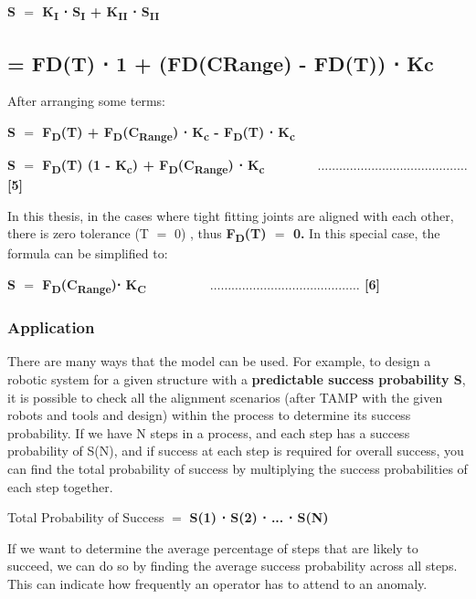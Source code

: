 \documentclass[11pt]{book}
\begin{document}
\textbf{S $=$ K\textsubscript{I} ⋅ S\textsubscript{I} + K\textsubscript{II} ⋅ S\textsubscript{II}}

\subsection{= FD(T) ⋅ 1 + (FD(CRange) - FD(T)) ⋅ Kc}

After arranging some terms:

\textbf{S $=$ F\textsubscript{D}(T) + F\textsubscript{D}(C\textsubscript{Range}) ⋅ K\textsubscript{c} - F\textsubscript{D}(T) ⋅ K\textsubscript{c}}

\textbf{S $=$ F\textsubscript{D}(T) (1 - K\textsubscript{c}) + F\textsubscript{D}(C\textsubscript{Range}) ⋅ K\textsubscript{c \ \ \ \ \ \ \ \ }$\ldots$$\ldots$$\ldots$$\ldots$$\ldots$$\ldots$$\ldots$$\ldots$$\ldots$$\ldots$$\ldots$$\ldots$$\ldots$$\ldots$ [5]}

In this thesis, in the cases where tight fitting joints are aligned with each other, there is zero tolerance (T $=$ 0) , thus \textbf{F\textsubscript{D}(T) $=$ 0.} In this special case, the formula can be simplified to:

\textbf{S $=$ F\textsubscript{D}(C\textsubscript{Range})⋅ K\textsubscript{C }\ \ \ \ \ \ \ \ $\ldots$$\ldots$$\ldots$$\ldots$$\ldots$$\ldots$$\ldots$$\ldots$$\ldots$$\ldots$$\ldots$$\ldots$$\ldots$$\ldots$ [6]}

\vspace{1\baselineskip}
\subsubsection{Application}

There are many ways that the model can be used. For example, to design a robotic system for a given structure with a \textbf{predictable success probability S}, it is possible to check all the alignment scenarios (after TAMP with the given robots and tools and design) within the process to determine its success probability. If we have N steps in a process, and each step has a success probability of S(N), and if success at each step is required for overall success, you can find the total probability of success by multiplying the success probabilities of each step together.

Total Probability of Success $=$ \textbf{S(1) ⋅ S(2) ⋅ ... ⋅ S(N) }

If we want to determine the average percentage of steps that are likely to succeed, we can do so by finding the average success probability across all steps. This can indicate how frequently an operator has to attend to an anomaly.
\end{document}

